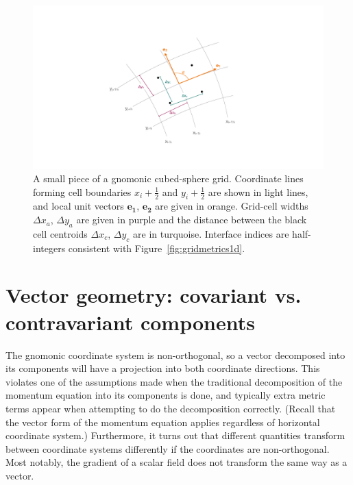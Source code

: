 \documentclass[10pt,letterpaper,margin=1in]{memoir}
\newcommand{\half}{\frac{1}{2}}
\begin{document}
\begin{figure}[tbp]
   \centering
   \includegraphics[scale=0.3]{gridmetricsCoordinates.pdf} %
   \caption{A small piece of a gnomonic cubed-sphere grid. Coordinate lines forming cell boundaries $x_i+\half$ and $y_i+\half$ are shown in light lines, and local unit vectors $\mathbf{e_1}$, $\mathbf{e_2}$ are given in orange. Grid-cell widths $\Delta x_a$, $\Delta y_a$ are given in purple and the distance between the black cell centroids $\Delta x_c$, $\Delta y_c$ are in turquoise. Interface indices are half-integers consistent with Figure~\ref{fig:gridmetrics1d}.}
   \label{fig:gridmetricsCoordinates}
\end{figure}

\section{Vector geometry: covariant vs. contravariant components} \label{sec:covarcontravarstaggered}

The gnomonic coordinate system is non-orthogonal, so a vector decomposed into its components will have a projection into both coordinate directions. This violates one of the assumptions made when the traditional decomposition of the momentum equation into its components is done, and typically extra metric terms appear when attempting to do the decomposition correctly. (Recall that the vector form of the momentum equation applies regardless of horizontal coordinate system.) Furthermore, it turns out that different quantities transform between coordinate systems differently if the coordinates are non-orthogonal. Most notably, the gradient of a scalar field does not transform the same way as a vector.
\end{document}
